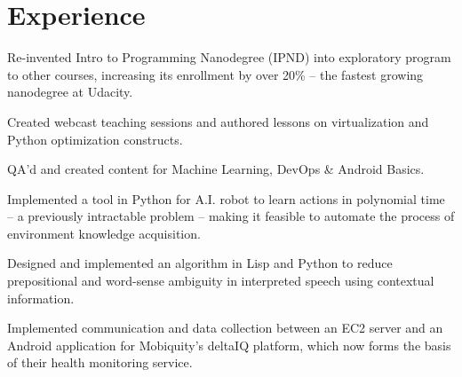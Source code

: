\documentclass[]{deedy-resume-openfont}
\begin{document}
\begin{minipage}[t]{0.66\textwidth} 


\section{Experience}

\vspace{\topsep} %
\begin{tightemize}

\item Re-invented Intro to Programming Nanodegree (IPND) into exploratory program to other courses, increasing its enrollment by over 20\% -- the fastest growing nanodegree at Udacity.

\item Created webcast teaching sessions and authored lessons on virtualization and Python optimization constructs.

\item QA'd and created content for Machine Learning, DevOps \& Android Basics.

\end{tightemize}
\sectionsep

\begin{tightemize}
\item Implemented a tool in Python for A.I. robot to learn actions in polynomial time -- a previously intractable problem -- making it feasible to automate the process of environment knowledge acquisition.

\item Designed and implemented an algorithm in Lisp and Python to reduce prepositional and word-sense ambiguity in interpreted speech using contextual information.
\end{tightemize}
\sectionsep

\begin{tightemize}
\item Implemented communication and data collection between an EC2 server and an Android application for Mobiquity’s deltaIQ platform, which now forms the basis of their health monitoring service.


\end{tightemize}
\end{minipage}
\end{document}
